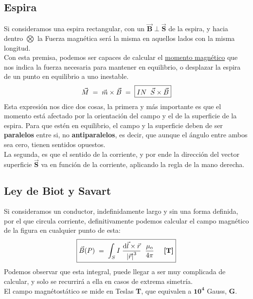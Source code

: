 \subsection{Espira}
\noindent Si consideramos una espira rectangular, con un \(\bm{\vec{B}\perp\vec{S}}\) de la espira, y hacia dentro \(\bm{\bigotimes}\) la Fuerza magnética será la misma en aquellos lados con la misma longitud.
\\
Con esta premisa, podemos ser capaces de calcular el \underline{momento magnético} que nos indica la fuerza necesaria para mantener en equilibrio, o desplazar la espira de un punto en equilibrio a uno inestable.
\[
        \vec{M} \hspace{1mm} = \hspace{1mm} \vec{m}\times\vec{B} \hspace{1mm} = \hspace{1mm} \boxed{IN \hspace{2mm} \vec{S} \times \vec{B}}
\]
Esta expresión nos dice dos cosas, la primera y más importante es que el momento está afectado por la orientación del campo y el de la superficie de la espira. Para que estén en equilibrio, el campo y la superficie deben de ser \textbf{paralelos} entre si, no \textbf{antiparalelos}, es decir, que aunque el ángulo entre ambos sea cero, tienen sentidos opuestos.
\\
La segunda, es que el sentido de la corriente, y por ende la dirección del vector superficie \(\bm{\vec{S}}\) va en función de la corriente, aplicando la regla de la mano derecha. %
\subsection{Ley de Biot y Savart}
\noindent Si consideramos un conductor, indefinidamente largo y sin una forma definida, por el que circula corriente, definitivamente podemos calcular el campo magnético de la figura en cualquier punto de esta:
\[
        \boxed{\vec{B}(P) \hspace{1mm}= \hspace{1mm}\int_{S} I\hspace{1mm}\frac{\mathrm{d}\vec{l}\times\vec{r}}{\left | \vec{r} \right |^3}\hspace{2mm}\frac{\mu_{\textnormal{o}}}{4\pi} \hspace{5mm}\textnormal{\textbf{[T]}}}
\]
\noindent Podemos observar que esta integral, puede llegar a ser muy complicada de calcular, y solo se recurrirá a ella en casos de extrema simetría.\\
El campo magnétostático se mide en Teslas \textbf{T}, que equivalen a \(\mathbf{10^4}\) Gauss, \textbf{G}.
